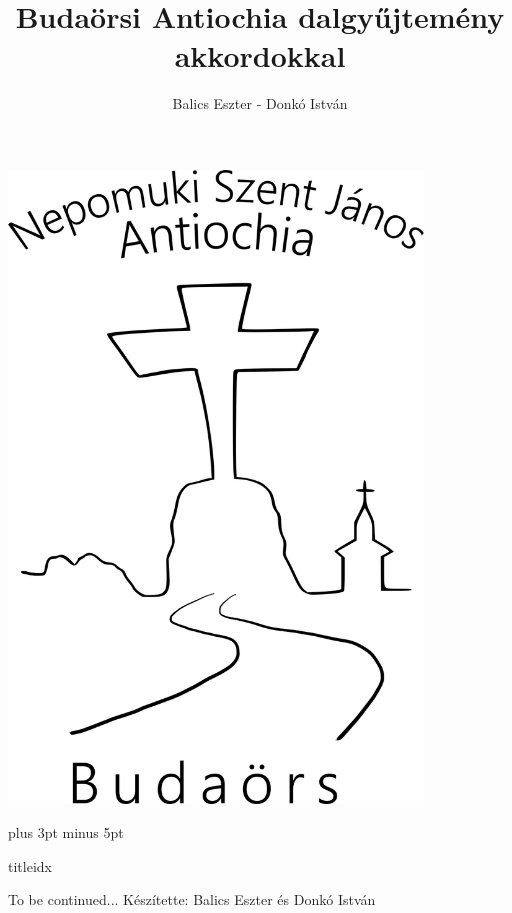 \documentclass[a5paper,twoside]{article}
\title{Budaörsi Antiochia dalgyűjtemény akkordokkal}
\author{Balics Eszter - Donkó István}
\begin{document}
  \begin{titlepage}
    \setlength{\oddsidemargin}{-1.3cm}

    \vspace*{0.75cm}
    \includegraphics[width=11cm]{Logo_07_final}

    \thispagestyle{empty}
  \end{titlepage}


  \versesep=12pt plus 3pt minus 5pt

  \begin{songs}{titleidx}
    
  \end{songs}

  \renewcommand{\thesongnum}{K\arabic{songnum}}
  \begin{songs}{}
    
  \end{songs}

  \renewcommand{\thesongnum}{M\arabic{songnum}}
  \begin{songs}{}
    
  \end{songs}

  \newpage
  \thispagestyle{empty}

  To be continued...
  \vfill
  Készítette: Balics Eszter és Donkó István
\end{document}
